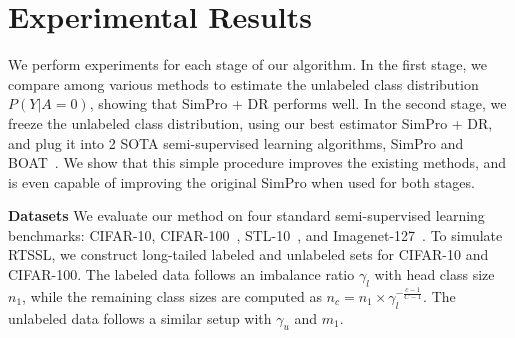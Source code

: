 

\section{Experimental Results}





We perform experiments for each stage of our algorithm. In the first stage, we compare among various methods to estimate the unlabeled class distribution $P(Y|A=0)$, showing that SimPro + DR performs well. In the second stage, we freeze the unlabeled class distribution, using our best estimator  SimPro + DR, and plug it into 2 SOTA semi-supervised learning algorithms, SimPro and BOAT~\cite{boat}. We show that this simple procedure improves the existing methods, and is even capable of improving the original SimPro when used for both stages.




\textbf{Datasets} We evaluate our method on four standard semi-supervised learning benchmarks: CIFAR-10, CIFAR-100~\cite{cifar}, STL-10~\cite{stl10}, and Imagenet-127~\cite{cossl}. To simulate RTSSL, we construct long-tailed labeled and unlabeled sets for CIFAR-10 and CIFAR-100. The labeled data follows an imbalance ratio $\gamma_l$ with head class size $n_1$, while the remaining class sizes are computed as $n_c = n_1 \times \gamma_l^{-\frac{c-1}{C-1}}$. The unlabeled data follows a similar setup with $\gamma_u$ and $m_1$.  


